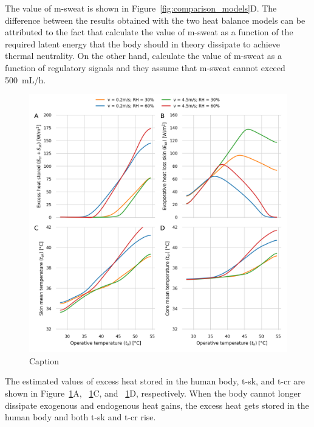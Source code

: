 The value of \ac{m-sweat} is shown in Figure~\ref{fig:comparison_models}D\@.
The difference between the results obtained with the two heat balance models can be attributed to the fact that \citeauthor{Jay2015} calculate the value of \ac{m-sweat} as a function of the required latent energy that the body should in theory dissipate to achieve thermal neutrality.
On the other hand, \citeauthor{GaggeSET} calculate the value of \ac{m-sweat} as a function of regulatory signals and they assume that \ac{m-sweat} cannot exceed 500~mL/h.

\begin{figure}[thb!]
    \centering
    \includegraphics[width=\textwidth]{figures/results_model_2.png}
    \caption{Caption}
    \label{fig:results_model_2}
\end{figure}

The estimated values of excess heat stored in the human body, \ac{t-sk}, and \ac{t-cr} are shown in Figure~\ref{fig:results_model_2}A, ~\ref{fig:results_model_2}C, and ~\ref{fig:results_model_2}D, respectively.
When the body cannot longer dissipate exogenous and endogenous heat gains, the excess heat gets stored in the human body and both \ac{t-sk} and \ac{t-cr} rise.

